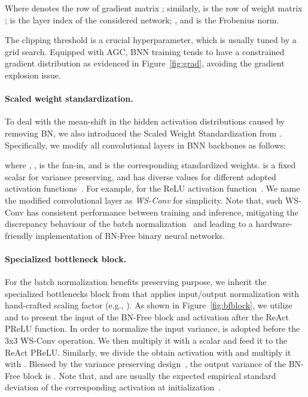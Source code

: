 \documentclass[final]{cvpr}
\begin{document}
Where  denotes the  row of gradient matrix ; similarly,  is the  row of weight matrix ;  is the layer index of the considered network; ,  and  is the Frobenius norm.

The clipping threshold  is a crucial hyperparameter, which is usually tuned by a grid search. Equipped with AGC, BNN training tends to have a constrained gradient distribution as evidenced in Figure~\ref{fig:grad}, avoiding the gradient explosion issue.

\paragraph{Scaled weight standardization.} To deal with the mean-shift in the hidden activation distributions caused by removing BN, we also introduced the Scaled Weight Standardization from \cite{brock2021characterizing}. Specifically, we modify all convolutional layers in BNN backbones as follows:


where , ,  is the fan-in, and  is the corresponding standardized weights.  is a fixed scalar for variance preserving, and has diverse values for different adopted activation functions~\cite{brock2021characterizing}. For example,  for the ReLU activation function~\cite{arpit2016normalization}. We name the modified convolutional layer as \textit{WS-Conv} for simplicity. Note that, such WS-Conv has consistent performance between training and inference, mitigating the discrepancy behaviour of the batch normalization~\cite{brock2021agc} and leading to a hardware-friendly implementation of BN-Free binary neural networks.

\paragraph{Specialized bottleneck block.} For the batch normalization benefits preserving purpose, we inherit the specialized bottlenecks block from \cite{brock2021characterizing,brock2021agc} that applies input/output normalization with hand-crafted scaling factor (e.g., ). As shown in Figure~\ref{fig:bfblock}, we utilize  and  to present the input of the  BN-Free block and activation after the ReAct PReLU function. In order to normalize the input variance,  is adopted before the 3x3 WS-Conv operation. We then multiply it with a scalar  and feed it to the ReAct PReLU. Similarly, we divide the obtain activation  with  and multiply it with . Blessed by the variance preserving design~\cite{brock2021characterizing,brock2021agc}, the output variance of the  BN-Free block is . Note that,  and  are usually the expected empirical standard deviation of the corresponding activation at initialization~\cite{brock2021agc}.  
\end{document}

